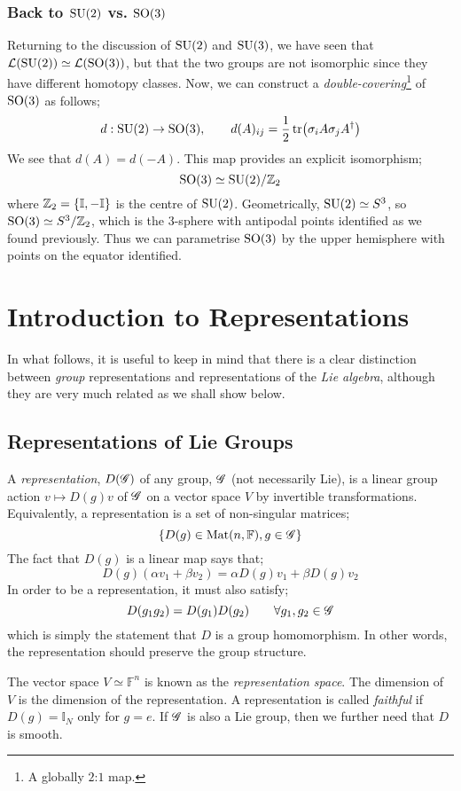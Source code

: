 \subsubsection{Back to $\SU{2}$ vs. $\SO{3}$}
Returning to the discussion of $\SU{2}$ and $\SU{3}$, we have seen that $\mL\left(\SU{2}\right) \simeq \mL\left(\SO{3}\right)$, but that the two groups are not isomorphic since they have different homotopy classes. Now, we can construct a \emph{double-covering}\footnote{A globally $2$:$1$ map.} of $\SO{3}$ as follows;
\begin{equation}
d : \SU{2} \rightarrow \SO{3}, \qquad d(A)_{ij} = \frac{1}{2}\tr\left(\sigma_i A \sigma_j A\dagg\right)
\end{equation}
We see that $d(A) = d(-A)$. This map provides an explicit isomorphism;
\begin{equation*}
\SO{3} \simeq \SU{2}/\ZZ_2
\end{equation*}
where $\ZZ_2 = \set{\mathbb{I}, - \mathbb{I}}$ is the centre of $\SU{2}$. Geometrically, $\SU{2} \simeq S^3$, so $\SO{3} \simeq S^3/\ZZ_2$, which is the $3$-sphere with antipodal points identified as we found previously. Thus we can parametrise $\SO{3}$ by the upper hemisphere with points on the equator identified.
\newpage
\section{Introduction to Representations}
In what follows, it is useful to keep in mind that there is a clear distinction between \emph{group} representations and representations of the \emph{Lie algebra}, although they are very much related as we shall show below.
\subsection{Representations of Lie Groups}
\begin{definitionbox}[Representation]
A \emph{representation}, $D(\mathscr{G})$ of any group, $\mathscr{G}$ (not necessarily Lie), is a linear group action $v \mapsto D(g)v$ of $\mathscr{G}$ on a vector space $V$ by invertible transformations. Equivalently, a representation is a set of non-singular matrices;
\begin{equation*}
\set{D(g) \in \text{Mat}(n, \mathbb{F}), g \in \group}
\end{equation*}
The fact that $D(g)$ is a linear map says that;
\begin{equation}
D(g)(\alpha v_1 + \beta v_2) = \alpha D(g)v_1 + \beta D(g)v_2
\end{equation}
In order to be a representation, it must also satisfy;
\begin{equation}
D(g_1 g_2) = D(g_1) D(g_2) \qquad \forall g_1, g_2 \in \mathscr{G}
\end{equation}
which is simply the statement that $D$ is a group homomorphism. In other words, the representation should preserve the group structure.
\end{definitionbox}
The vector space $V \simeq \mathbb{F}^n$ is known as the \emph{representation space}. The dimension of $V$ is the dimension of the representation. A representation is called \emph{faithful} if $D(g) = \mathbb{I}_N$ only for $g = e$. If $\mathscr{G}$ is also a Lie group, then we further need that $D$ is smooth.
